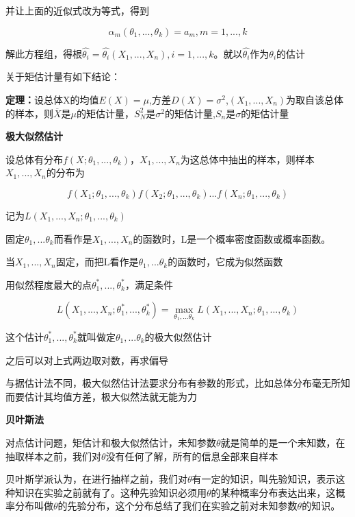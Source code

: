\documentclass{ctexart}
\begin{document}
	并让上面的近似式改为等式，得到
	
	\[\alpha_m(\theta_1,...,\theta_k)=a_m, m=1,...,k\]
	
	解此方程组，得根\(\hat{\theta_i}=\hat{\theta_i}(X_1,...,X_n), i=1,...,k\)。就以\(\hat{\theta_i}\)作为\(\theta_i\)的估计
	
	关于矩估计量有如下结论：
	
	\textbf{定理：}设总体X的均值\(E(X)=\mu\),方差\(D(X)=\sigma^2\),\((X_1,...,X_n)\)为取自该总体的样本，则\(\overline{X}\)是\(\mu\)的矩估计量，\(S_N^2\)是\(\sigma^2\)的矩估计量,\(S_n\)是\(\sigma\)的矩估计量
	
	\mbox{}
	
	\textbf{极大似然估计}
	
	设总体有分布\(f(X; \theta_1,...,\theta_k)\)，\(X_1,...,X_n\)为这总体中抽出的样本，则样本\(X_1,...,X_n\)的分布为
	
	\[f(X_1; \theta_1,...,\theta_k)f(X_2; \theta_1,...,\theta_k)...f(X_n; \theta_1,...,\theta_k)\]
	
	记为\(L(X_1,...,X_n;\theta_1,...,\theta_k)\)
	
	固定\(\theta_1,...\theta_k\)而看作是\(X_1,...,X_n\)的函数时，L是一个概率密度函数或概率函数。
	
	当\(X_1,...,X_n\)固定，而把L看作是\(\theta_1,...\theta_k\)的函数时，它成为似然函数
	
	用似然程度最大的点\(\theta_1^*,...,\theta_k^*\)，满足条件
	
	\[L(X_1,...,X_n;\theta_1^*,...,\theta_k^*)=\max_{\theta_1,...\theta_k}L(X_1,...,X_n;\theta_1,...,\theta_k)\]
	
	这个估计\(\theta_1^*,...,\theta_k^*\)就叫做定\(\theta_1,...\theta_k\)的极大似然估计
	
	之后可以对上式两边取对数，再求偏导
	
	{\color{red}与据估计法不同，极大似然估计法要求分布有参数的形式，比如总体分布毫无所知而要估计其均值方差，极大似然法就无能为力}
	
	\mbox{}
	
	\textbf{贝叶斯法}
	
	对点估计问题，矩估计和极大似然估计，未知参数\(\theta\)就是简单的是一个未知数，在抽取样本之前，我们对\(\theta\)没有任何了解，所有的信息全部来自样本
	
	贝叶斯学派认为，在进行抽样之前，我们对\(\theta\)有一定的知识，叫先验知识，表示这种知识在实验之前就有了。这种先验知识必须用\(\theta\)的某种概率分布表达出来，这概率分布叫做\(\theta\)的先验分布，这个分布总结了我们在实验之前对未知参数\(\theta\)的知识。
	
\end{document}
